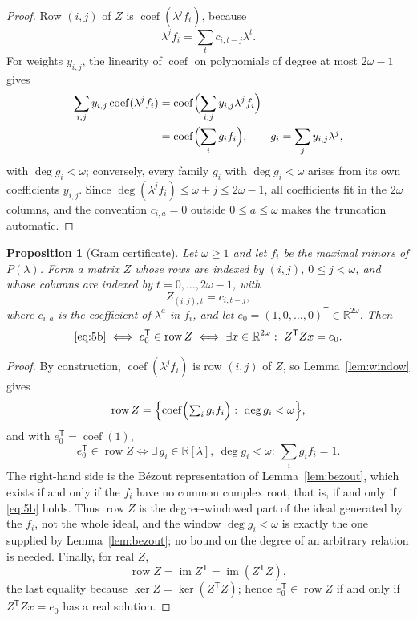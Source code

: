 \documentclass[journal]{IEEEtran}
\theoremstyle{plainn}
\newtheorem{prop}[thm]{Proposition}
\theoremstyle{remark}
\begin{document}
\begin{proof}
	Row $(i,j)$ of $Z$ is $\operatorname{coef}(\lambda^jf_i)$, because
	\[
	\lambda^jf_i=\sum_t c_{i,t-j}\lambda^t .
	\]
	For weights $y_{i,j}$, the linearity of $\operatorname{coef}$ on
	polynomials of degree at most $2\omega-1$ gives
	\[
	\begin{aligned}
	\sum_{i,j}y_{i,j}\operatorname{coef}(\lambda^jf_i)
	&=\operatorname{coef}\Bigl(\sum_{i,j}y_{i,j}\lambda^jf_i\Bigr)\\
	&=\operatorname{coef}\Bigl(\sum_i g_if_i\Bigr),
	\qquad g_i=\sum_j y_{i,j}\lambda^j,
	\end{aligned}
	\]
	with $\deg g_i<\omega$; conversely, every family $g_i$ with
	$\deg g_i<\omega$ arises from its own coefficients $y_{i,j}$. Since
	$\deg(\lambda^jf_i)\le\omega+j\le2\omega-1$, all coefficients fit in
	the $2\omega$ columns, and the convention $c_{i,a}=0$ outside
	$0\le a\le\omega$ makes the truncation automatic.
\end{proof}

\begin{prop}[Gram certificate]\label{prop:gram}\label{sec:gram}
	Let $\omega\ge1$ and let $f_i$ be the maximal minors of $P(\lambda)$.
	Form a matrix $Z$ whose rows are indexed by $(i,j)$, $0\le j<\omega$,
	and whose columns are indexed by $t=0,\ldots,2\omega-1$, with
	\[
	Z_{(i,j),t}=c_{i,t-j},
	\]
	where $c_{i,a}$ is the coefficient of $\lambda^a$ in $f_i$, and let
	$e_0=(1,0,\ldots,0)^{\mathsf T}\in\mathbb R^{2\omega}$. Then
	\[
	\eqref{eq:5b}
	\iff e_0^{\mathsf T}\in\operatorname{row}Z
	\iff\exists x\in\mathbb R^{2\omega}:\ Z^{\mathsf T}Zx=e_0 .
	\]
\end{prop}

\begin{proof}
	By construction, $\operatorname{coef}(\lambda^jf_i)$ is row $(i,j)$ of
	$Z$, so Lemma~\ref{lem:window} gives
	\[
	\operatorname{row}Z=
	\Bigl\{
	\operatorname{coef}\Bigl(\textstyle\sum_i g_if_i\Bigr)
	:\ \deg g_i<\omega
	\Bigr\},
	\]
	and with $e_0^{\mathsf T}=\operatorname{coef}(1)$,
	\[
	e_0^{\mathsf T}\in\operatorname{row}Z
	\iff
	\exists\,g_i\in\mathbb R[\lambda],\ \deg g_i<\omega:\
	\sum_i g_if_i=1 .
	\]
	The right-hand side is the B\'ezout representation of
	Lemma~\ref{lem:bezout}, which exists if and only if the $f_i$ have no
	common complex root, that is, if and only if \eqref{eq:5b} holds. Thus
	$\operatorname{row}Z$ is the degree-windowed part of the ideal generated
	by the $f_i$, not the whole ideal, and the window $\deg g_i<\omega$ is
	exactly the one supplied by Lemma~\ref{lem:bezout}; no bound on the
	degree of an arbitrary relation is needed. Finally, for real $Z$,
	\[
	\operatorname{row}Z=\operatorname{im}Z^{\mathsf T}
	=\operatorname{im}(Z^{\mathsf T}Z),
	\]
	the last equality because $\ker Z=\ker(Z^{\mathsf T}Z)$; hence
	$e_0^{\mathsf T}\in\operatorname{row}Z$ if and only if
	$Z^{\mathsf T}Zx=e_0$ has a real solution.
\end{proof}
\end{document}
